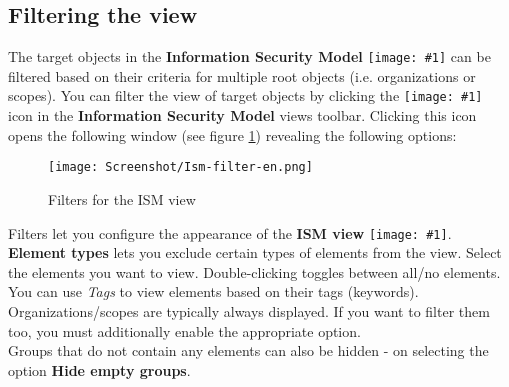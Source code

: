 \documentclass[a4paper,10pt]{book}
\newcommand{\icon}[1]{\texttt{[image: \#1]}}
\begin{document}
\subsection{Filtering the view}
The target objects in the \textbf{Information Security Model} \icon{Icon/Informationssicherheitsmodell.png} can be filtered based on their criteria for multiple root objects (i.e. organizations or scopes).
You can filter the view of target objects by clicking the \icon{Icon/Filter.png} icon in the \textbf{Information Security Model} views toolbar.
Clicking this icon opens the following window (see figure \ref{Filters for the ISM view}) revealing the following options:
\newline
\begin{figure}[htb!]
  \centering
  \texttt{[image: Screenshot/Ism-filter-en.png]}
  \caption{\label{Filters for the ISM view} Filters for the ISM view}
\end{figure}
\newline
Filters let you configure the appearance of the \textbf{ISM view}
\icon{Icon/Informationssicherheitsmodell.png}.
\newline\\
\textbf{Element types} lets you exclude certain types of elements from the view.
Select the elements you want to view. Double-clicking toggles between all/no elements.
\newline\\
You can use {\em Tags} to view elements based on their tags (keywords). Organizations/scopes are
typically always displayed. If you want to filter them too, you must additionally enable the appropriate option.
\newline\\
Groups that do not contain any elements can also be hidden - on selecting the option \textbf{Hide empty groups}.
\end{document}
